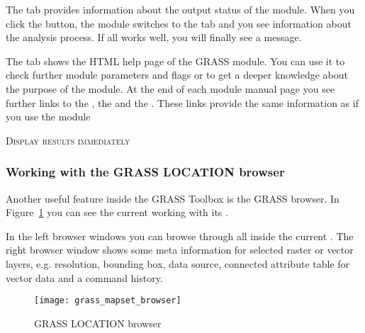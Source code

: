 
The  tab provides information about the output status of the 
module. When you click the  button, the module switches to the 
 tab and you see information about the analysis process. If all 
works well, you will finally see a  message.


The  tab shows the HTML help page of the GRASS module. You can 
use it to check further module parameters and flags or to get a deeper 
knowledge about the purpose of the module. At the end of each module 
manual page you see further links to the , the 
 and the . These links provide 
the same information as if you use the module  

\begin{Tip}\caption{\textsc{Display results immediately}}
\end{Tip} 

\subsubsection{Working with the GRASS LOCATION browser} 

Another useful feature inside the GRASS Toolbox is the GRASS 
 browser. In Figure~\ref{fig:grass_mapset_browser} you 
can see the current working  with its .

In the left browser windows you can browse through all  
inside the current . The right browser window shows some 
meta information for selected raster or vector layers, e.g. resolution, 
bounding box, data source, connected attribute table for vector data and a 
command history.

\begin{figure}[h]
 \begin{center}
 \caption{GRASS LOCATION browser \nixcaption}\label{fig:grass_mapset_browser}
 \texttt{[image: grass\_mapset\_browser]}
 \end{center}
\end{figure}

